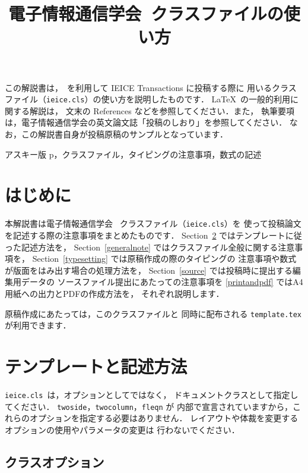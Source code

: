 \documentclass[paper]{ieice}
\title{電子情報通信学会\LaTeXe\ クラスファイルの使い方}
\def\ClassFile{\texttt{ieice.cls}}
\begin{document}
\maketitle

\begin{summary}
この解説書は，\LaTeXe\ を利用して IEICE Transactions に投稿する際に
用いるクラスファイル（\ClassFile{}）の使い方を説明したものです．
\LaTeX\ の一般的利用に関する解説は，
文末の References などを参照してください．また，
執筆要項は，電子情報通信学会の英文論文誌「投稿のしおり」を参照してください．
なお，この解説書自身が投稿原稿のサンプルとなっています．
\end{summary}
\begin{keywords}
アスキー版 p\LaTeXe{}，クラスファイル，タイピングの注意事項，数式の記述
\end{keywords}

\section{はじめに}\label{intro}

本解説書は電子情報通信学会 \LaTeXe\ クラスファイル（\ClassFile{}）を
使って投稿論文を記述する際の注意事項をまとめたものです．
Section~\ref{usage} ではテンプレートに従った記述方法を，
Section~\ref{generalnote} ではクラスファイル全般に関する注意事項を，
Section~\ref{typesetting} では原稿作成の際のタイピングの
注意事項や数式が版面をはみ出す場合の処理方法を，
Section~\ref{source} では投稿時に提出する編集用データの
ソースファイル提出にあたっての注意事項を
\ref{printandpdf} ではA4用紙への出力とPDFの作成方法を，
それぞれ説明します．

原稿作成にあたっては，このクラスファイルと
同時に配布される \texttt{template.tex} が利用できます．

\section{テンプレートと記述方法}\label{usage}

\ClassFile\ は，オプションとしてではなく，
ドキュメントクラスとして指定してください．
\texttt{twoside}，\texttt{twocolumn}，\texttt{fleqn} が
内部で宣言されていますから，これらのオプションを指定する必要はありません．
レイアウトや体裁を変更するオプションの使用やパラメータの変更は
行わないでください．

\subsection{クラスオプション}
\end{document}
